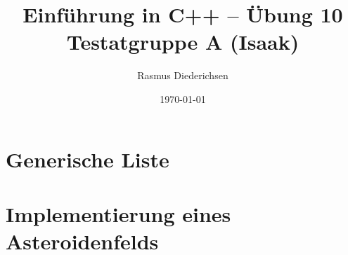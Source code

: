 \documentclass{article}
\title{Einführung in C++ -- Übung 10 \\ Testatgruppe A (Isaak)}
\author{Rasmus Diederichsen}
\date{\today}
\begin{document}
   \maketitle

   \section{Generische Liste}

   
   
   
   \section{Implementierung eines Asteroidenfelds}
   

   
   
   
\end{document}
